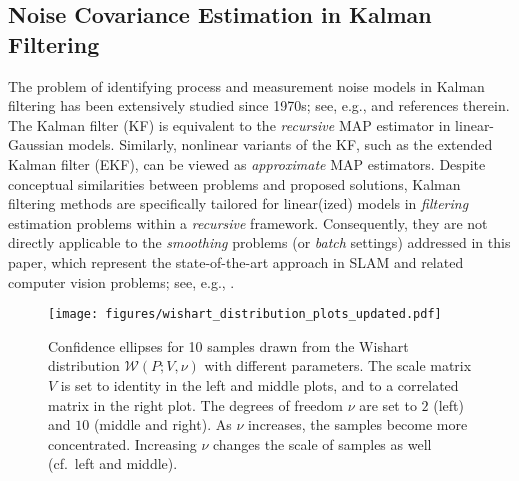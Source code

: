 \subsection{Noise Covariance Estimation in Kalman Filtering}
The problem of identifying process and measurement noise models in Kalman
filtering has been extensively studied since 1970s; see, e.g.,
\cite{zhang2020identification,chen2023kalman,forsling2024matrix} and references therein. The Kalman filter (KF) is
equivalent to the \emph{recursive} MAP estimator in linear-Gaussian models.
Similarly, nonlinear variants of the KF, such as the extended Kalman filter
(EKF), can be viewed as \emph{approximate} MAP estimators.  Despite conceptual
similarities between problems and proposed solutions, Kalman filtering methods
are specifically tailored for linear(ized) models in \emph{filtering} estimation
problems within a \emph{recursive} framework. Consequently, they are not
directly applicable to the \emph{smoothing} problems (or \emph{batch} settings)
addressed in this paper, which represent the state-of-the-art approach in SLAM
and related computer vision problems; see, e.g., \cite{dellaert2017factor}.

\begin{figure}[t]
		\centering
		\texttt{[image: figures/wishart\_distribution\_plots\_updated.pdf]}
		\caption{Confidence ellipses for 10 samples drawn from the Wishart distribution 
				$\mathcal{W}(P;V,\nu)$ with different parameters. The scale matrix $V$ is set 
				to identity in the left and middle plots, and to a correlated matrix in the 
				right plot. The degrees of freedom $\nu$ are set to $2$ (left) and $10$ (middle and right). 
				As $\nu$ increases, the samples become more concentrated. Increasing $\nu$ changes the scale of samples as
well (cf.\ left and middle).}
		\label{fig:wishart}
\end{figure}